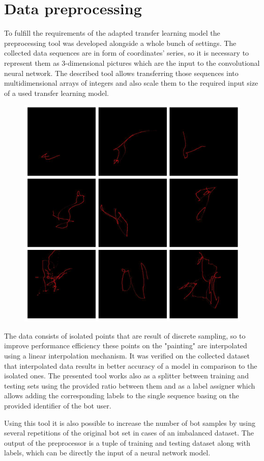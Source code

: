 \section{Data preprocessing}\label{sec:data-preprocessing}
To fulfill the requirements of the adapted transfer learning model the preprocessing tool was developed alongside a whole bunch of settings.
The collected data sequences are in form of coordinates' series, so it is necessary to represent them as 3-dimensional pictures which are the input to the convolutional neural network.
The described tool allows transferring those sequences into multidimensional arrays of integers and also scale them to the required input size of a used transfer learning model.

\begin{figure}[!hbt]
    \center
    \includegraphics[width=0.6\linewidth]{resources/sequences}
    \label{fig:sequences}
\end{figure}

The data consists of isolated points that are result of discrete sampling, so to improve performance efficiency these points on the "painting" are interpolated using a linear interpolation mechanism.
It was verified on the collected dataset that interpolated data results in better accuracy of a model in comparison to the isolated ones.
The presented tool works also as a splitter between training and testing sets using the provided ratio between them and as a label assigner which allows adding the corresponding labels to the single sequence basing on the provided identifier of the bot user.

Using this tool it is also possible to increase the number of bot samples by using several repetitions of the original bot set in cases of an imbalanced dataset.
The output of the preprocessor is a tuple of training and testing dataset along with labels, which can be directly the input of a neural network model.
